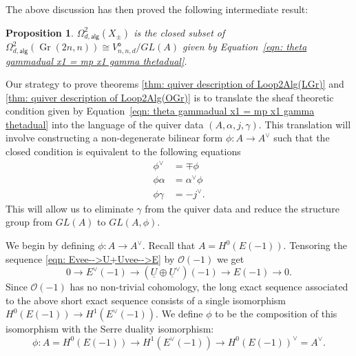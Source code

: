 \documentclass{amsart}
\newtheorem{proposition}[theorem]{Proposition}
\theoremstyle{definition}
\newcommand{\OO}{\mathcal{O}}
\newcommand{\UL}[1]{\underline{#1}}
\newcommand{\alg}{\mathsf{alg}}
\newcommand{\open}{\mathsf{o}}
\newcommand{\Gr}{\operatorname{Gr}}
\newcommand{\LoopTwo}{\Omega^{2}_{d,\alg}}
\newcommand{\Xpm}{X_{\pm}}
\begin{document}
The above discussion has then proved the following intermediate result:

\begin{proposition}\label{prop: Loop2(Xpm) is a closed set in
Loop(Gr(n,2n)) satisfying condition involving theta and gamma}
$\LoopTwo (\Xpm )$ is the closed subset of $\LoopTwo (\Gr(2n,n))\cong
V^{\open}_{n,n,d}/GL(A)$ given by Equation~\eqref{eqn: theta gammadual x1
= mp x1 gamma thetadual}. 
\end{proposition}

Our strategy to prove theorems \ref{thm: quiver description of
Loop2Alg(LGr)} and \ref{thm: quiver description of Loop2Alg(OGr)} is
to translate the sheaf theoretic condition given by
Equation~\eqref{eqn: theta gammadual x1 = mp x1 gamma thetadual} into
the language of the quiver data $(A,\alpha ,j,\gamma )$. This
translation will involve constructing a non-degenerate bilinear form
$\phi :A\to A^{\vee}$ such that the closed condition is equivalent to
the following equations
\begin{align}\label{eqns: closed conditions}
\phi^{\vee}&= \mp \phi \nonumber \\ 
\phi \alpha &=\alpha^{\vee}\phi \\
\phi \gamma &= - j^{\vee}. \nonumber 
\end{align}
This will allow us to eliminate $\gamma$ from the quiver data and
reduce the structure group from $GL(A)$ to $GL(A,\phi )$.

We begin by defining $\phi :A\to A^{\vee}$. Recall that $A =
H^{0}(E(-1))$. Tensoring the sequence \eqref{eqn:
Evee-->U+Uvee-->E} by $\OO (-1)$ we get
\[
0\to E^{\vee}(-1)\to (\UL{U}\oplus \UL{U}^{\vee})(-1)\to E(-1)\to 0.
\]
Since $\OO (-1)$ has no non-trivial cohomology, the long exact
sequence associated to the above short exact sequence consists of a
single isomorphism $H^{0}(E(-1))\to H^{1}(E^{\vee}(-1))$. We define
$\phi$ to be the composition of this isomorphism with the Serre
duality isomorphism: 
\[
\phi : A = H^{0}(E(-1))\to H^{1}(E^{\vee}(-1)) \to H^{0}(E(-1))^{\vee}=A^{\vee}.
\]
\end{document}
